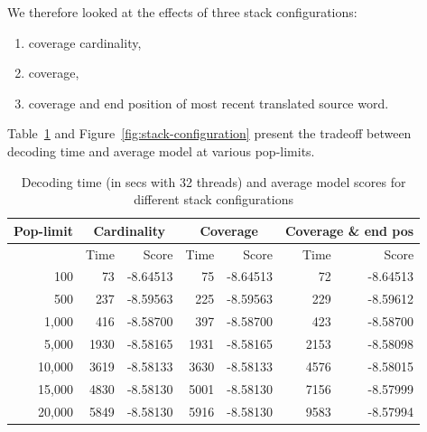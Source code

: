 \documentclass[11pt]{article}
\begin{document}
We therefore looked at the effects of three stack configurations:
\begin{enumerate}
  \item coverage cardinality,
  \item coverage,
  \item coverage and end position of most recent translated source word.
\end{enumerate}
Table~\ref{tab:stack-configuration} and Figure~\ref{fig:stack-configuration} present the tradeoff between decoding time and average model at various pop-limits.
\begin{table}[t]
\small
\begin{center}
\begin{tabular}{|r|r|r|r|r|r|r|} \hline
Pop-limit	& \multicolumn{2}{c|}{Cardinality}	& \multicolumn{2}{c|}{Coverage}	& \multicolumn{2}{c|}{Coverage \& end pos} \\ \hline
		& Time		& Score			& Time		& Score		& Time		& Score	\\ \hline
100  		& 73		& -8.64513 		& 75		& -8.64513	& 72	& -8.64513 \\
500		& 237		& -8.59563		& 225		& -8.59563 	& 229	& -8.59612 \\
1,000	 	& 416		& -8.58700		& 397		& -8.58700	& 423	& -8.58700 \\ 
5,000 		& 1930		& -8.58165		& 1931		& -8.58165	& 2153	& -8.58098 \\ 
10,000 		& 3619		& -8.58133		& 3630		& -8.58133	& 4576	& -8.58015 \\ 
15,000 		& 4830		& -8.58130		& 5001		& -8.58130	& 7156	& -8.57999 \\ 
20,000 		& 5849		& -8.58130		& 5916		& -8.58130	& 9583	& -8.57994 \\ \hline
\end{tabular}
\end{center}
\caption{Decoding time (in secs with 32 threads) and average model scores for different stack configurations}
\label{tab:stack-configuration}
\end{table}
\end{document}
